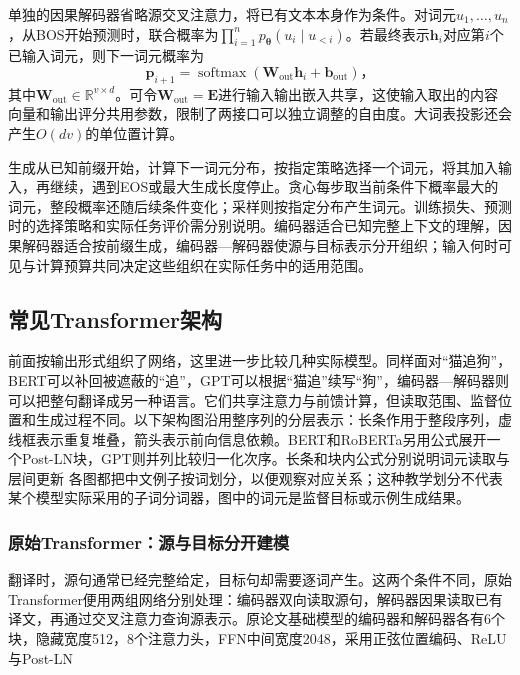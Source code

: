单独的因果解码器省略源交叉注意力，将已有文本本身作为条件。对词元$u_1,\ldots,u_n$，从BOS开始预测时，联合概率为$\prod_{i=1}^n p_{\bm\theta}(u_i\mid u_{<i})$。若最终表示$\bm h_i$对应第$i$个已输入词元，则下一词元概率为
\begin{equation}
  \bm p_{i+1}=\operatorname{softmax}
     (\bm W_{\mathrm{out}}\bm h_i+\bm b_{\mathrm{out}})\text{，}
  \label{eq:transformer-vocabulary-head}
\end{equation}
其中$\bm W_{\mathrm{out}}\in\mathbb R^{v\times d}$。可令$\bm W_{\mathrm{out}}=\bm E$进行输入输出嵌入共享，这使输入取出的内容向量和输出评分共用参数，限制了两接口可以独立调整的自由度。大词表投影还会产生$O(dv)$的单位置计算。

生成从已知前缀开始，计算下一词元分布，按指定策略选择一个词元，将其加入输入，再继续，遇到EOS或最大生成长度停止。贪心每步取当前条件下概率最大的词元，整段概率还随后续条件变化；采样则按指定分布产生词元。训练损失、预测时的选择策略和实际任务评价需分别说明。编码器适合已知完整上下文的理解，因果解码器适合按前缀生成，编码器—解码器使源与目标表示分开组织；输入何时可见与计算预算共同决定这些组织在实际任务中的适用范围。

\subsection{常见Transformer架构}
\label{sec:transformer-common-architectures}

前面按输出形式组织了网络，这里进一步比较几种实际模型。同样面对“猫追狗”，BERT可以补回被遮蔽的“追”，GPT可以根据“猫追”续写“狗”，编码器—解码器则可以把整句翻译成另一种语言。它们共享注意力与前馈计算，但读取范围、监督位置和生成过程不同。以下架构图沿用整序列的分层表示：长条作用于整段序列，虚线框表示重复堆叠，箭头表示前向信息依赖。BERT和RoBERTa另用公式展开一个Post-LN块，GPT则并列比较归一化次序。长条和块内公式分别说明词元读取与层间更新 各图都把中文例子按词划分，以便观察对应关系；这种教学划分不代表某个模型实际采用的子词分词器，图中的词元是监督目标或示例生成结果。

\subsubsection{原始Transformer：源与目标分开建模}

翻译时，源句通常已经完整给定，目标句却需要逐词产生。这两个条件不同，原始Transformer便用两组网络分别处理：编码器双向读取源句，解码器因果读取已有译文，再通过交叉注意力查询源表示。原论文基础模型的编码器和解码器各有6个块，隐藏宽度512，8个注意力头，FFN中间宽度2048，采用正弦位置编码、ReLU与Post-LN

